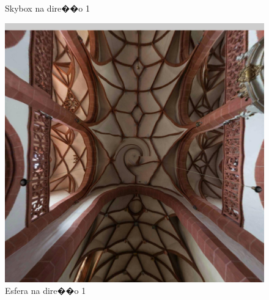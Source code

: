 \documentclass[12pt]{article}
\begin{document}
\begin{figure}[!tbp]
\begin{minipage}[b]{0.3\textwidth}
    \caption{Skybox na dire��o 1}
    \label{fig:skybox_direction_1}
  \end{minipage}
  \hfill
  \begin{minipage}[b]{0.3\textwidth}
    \centering
    \includegraphics[width=1.1\textwidth]{../images/screenshots/Screenshot_2_Sphere.jpg}
    \caption{Esfera na dire��o 1}
    \label{fig:sphere_direction_1}
  \end{minipage}
\end{figure}
\end{document}
